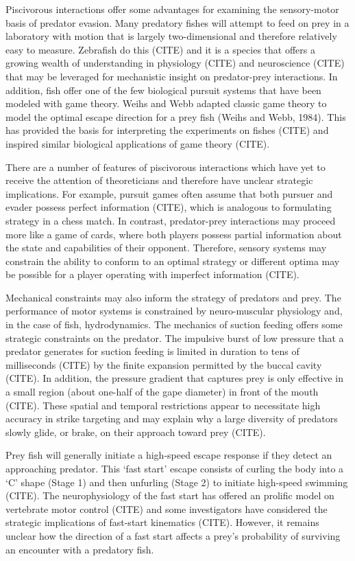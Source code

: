 \documentclass[12pt]{article}
\begin{document}
Piscivorous interactions offer some advantages for examining the sensory-motor basis of predator evasion. Many predatory fishes will attempt to feed on prey in a laboratory with motion that is largely two-dimensional and therefore relatively easy to measure. Zebrafish do this (CITE) and it is a species that offers a growing wealth of understanding in physiology (CITE) and neuroscience (CITE) that may be leveraged for mechanistic insight on predator-prey interactions. In addition, fish offer one of the few biological pursuit systems that have been modeled with game theory. Weihs and Webb adapted classic game theory to model the optimal escape direction for a prey fish (Weihs and Webb, 1984). This has provided the basis for interpreting the experiments on fishes (CITE) and inspired similar biological applications of game theory (CITE). 
	
There are a number of features of piscivorous interactions which have yet to receive the attention of theoreticians and therefore have unclear strategic implications. For example, pursuit games often assume that both pursuer and evader possess perfect information (CITE), which is analogous to formulating strategy in a chess match. In contrast, predator-prey interactions may proceed more like a game of cards, where both players possess partial information about the state and capabilities of their opponent. Therefore, sensory systems may constrain the ability to conform to an optimal strategy or different optima may be possible for a player operating with imperfect information (CITE). 

Mechanical constraints may also inform the strategy of predators and prey. The performance of motor systems is constrained by neuro-muscular physiology and, in the case of fish, hydrodynamics. The mechanics of suction feeding offers some strategic constraints on the predator. The impulsive burst of low pressure that a predator generates for suction feeding is limited in duration to tens of milliseconds (CITE) by the finite expansion permitted by the buccal cavity (CITE). In addition, the pressure gradient that captures prey is only effective in a small region (about one-half of the gape diameter) in front of the mouth (CITE). These spatial and temporal restrictions appear to necessitate high accuracy in strike targeting and may explain why a large diversity of predators slowly glide, or brake, on their approach toward prey (CITE). 

Prey fish will generally initiate a high-speed escape response if they detect an approaching predator. This ‘fast start’ escape consists of curling the body into a ‘C’ shape (Stage 1) and then unfurling (Stage 2) to initiate high-speed swimming (CITE). The neurophysiology of the fast start has offered an prolific model on vertebrate motor control (CITE) and some investigators have considered the strategic implications of fast-start kinematics (CITE). However, it remains unclear how the direction of a fast start affects a prey’s probability of surviving an encounter with a predatory fish. 
\end{document}
